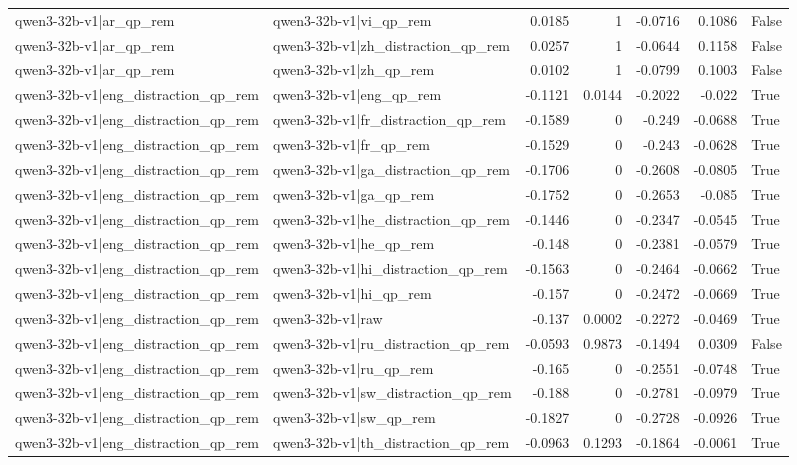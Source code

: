 \begin{table}
\begin{tabular}{l l r r r r l}
qwen3-32b-v1|ar_qp_rem & qwen3-32b-v1|vi_qp_rem & 0.0185 & 1 & -0.0716 & 0.1086 & False \\
qwen3-32b-v1|ar_qp_rem & qwen3-32b-v1|zh_distraction_qp_rem & 0.0257 & 1 & -0.0644 & 0.1158 & False \\
qwen3-32b-v1|ar_qp_rem & qwen3-32b-v1|zh_qp_rem & 0.0102 & 1 & -0.0799 & 0.1003 & False \\
qwen3-32b-v1|eng_distraction_qp_rem & qwen3-32b-v1|eng_qp_rem & -0.1121 & 0.0144 & -0.2022 & -0.022 & True \\
qwen3-32b-v1|eng_distraction_qp_rem & qwen3-32b-v1|fr_distraction_qp_rem & -0.1589 & 0 & -0.249 & -0.0688 & True \\
qwen3-32b-v1|eng_distraction_qp_rem & qwen3-32b-v1|fr_qp_rem & -0.1529 & 0 & -0.243 & -0.0628 & True \\
qwen3-32b-v1|eng_distraction_qp_rem & qwen3-32b-v1|ga_distraction_qp_rem & -0.1706 & 0 & -0.2608 & -0.0805 & True \\
qwen3-32b-v1|eng_distraction_qp_rem & qwen3-32b-v1|ga_qp_rem & -0.1752 & 0 & -0.2653 & -0.085 & True \\
qwen3-32b-v1|eng_distraction_qp_rem & qwen3-32b-v1|he_distraction_qp_rem & -0.1446 & 0 & -0.2347 & -0.0545 & True \\
qwen3-32b-v1|eng_distraction_qp_rem & qwen3-32b-v1|he_qp_rem & -0.148 & 0 & -0.2381 & -0.0579 & True \\
qwen3-32b-v1|eng_distraction_qp_rem & qwen3-32b-v1|hi_distraction_qp_rem & -0.1563 & 0 & -0.2464 & -0.0662 & True \\
qwen3-32b-v1|eng_distraction_qp_rem & qwen3-32b-v1|hi_qp_rem & -0.157 & 0 & -0.2472 & -0.0669 & True \\
qwen3-32b-v1|eng_distraction_qp_rem & qwen3-32b-v1|raw & -0.137 & 0.0002 & -0.2272 & -0.0469 & True \\
qwen3-32b-v1|eng_distraction_qp_rem & qwen3-32b-v1|ru_distraction_qp_rem & -0.0593 & 0.9873 & -0.1494 & 0.0309 & False \\
qwen3-32b-v1|eng_distraction_qp_rem & qwen3-32b-v1|ru_qp_rem & -0.165 & 0 & -0.2551 & -0.0748 & True \\
qwen3-32b-v1|eng_distraction_qp_rem & qwen3-32b-v1|sw_distraction_qp_rem & -0.188 & 0 & -0.2781 & -0.0979 & True \\
qwen3-32b-v1|eng_distraction_qp_rem & qwen3-32b-v1|sw_qp_rem & -0.1827 & 0 & -0.2728 & -0.0926 & True \\
qwen3-32b-v1|eng_distraction_qp_rem & qwen3-32b-v1|th_distraction_qp_rem & -0.0963 & 0.1293 & -0.1864 & -0.0061 & True \\

\end{tabular}
\end{table}
